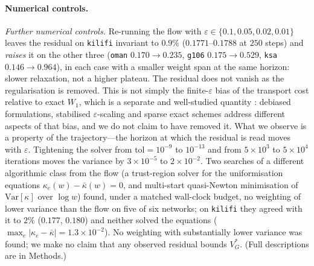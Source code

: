 \documentclass[11pt]{article}
\newcommand{\Var}{\mathrm{Var}}
\begin{document}
\paragraph{Numerical controls.}
\emph{Further numerical controls.} Re-running the flow with
$\varepsilon\in\{0.1,0.05,0.02,0.01\}$ leaves the residual on
\texttt{kilifi} invariant to $0.9\%$ ($0.1771$--$0.1788$ at $250$ steps) and
\emph{raises} it on the other three (\texttt{oman} $0.170\to0.235$,
\texttt{g106} $0.175\to0.529$, \texttt{ksa} $0.146\to0.964$), in each case
with a smaller weight span at the same horizon: slower relaxation, not a higher
plateau. The residual does not vanish as the regularisation is removed. This is
not simply the finite-$\varepsilon$ bias of the transport cost relative to exact
$W_1$, which is a separate and well-studied quantity
\cite{Genevay2019,Feydy2019,Janati2020,Schmitzer2019}: debiased formulations, stabilised
$\varepsilon$-scaling and sparse exact schemes address different aspects of that
bias, and we do not claim to have removed it. What we observe is a property of
the trajectory---the horizon at which the residual is read moves with
$\varepsilon$. Tightening the solver from $\text{tol}=10^{-9}$ to $10^{-13}$
and from $5\times10^3$ to $5\times10^4$ iterations moves the variance by
$3\times10^{-5}$ to $2\times10^{-2}$. Two searches of a different algorithmic
class from the flow (a trust-region solver for the uniformisation equations
$\kappa_e(w)-\bar\kappa(w)=0$, and multi-start quasi-Newton minimisation of
$\Var[\kappa]$ over $\log w$) found, under a matched wall-clock budget, no
weighting of lower variance than the flow on five of six networks; on
\texttt{kilifi} they agreed with it to $2\%$ ($0.177$, $0.180$) and
neither solved the equations
($\max_e|\kappa_e-\bar\kappa|=1.3\times10^{-2}$). No weighting with
substantially lower variance was found; we make no claim that any observed
residual bounds $V_G^*$. (Full descriptions are in Methods.)
\end{document}
